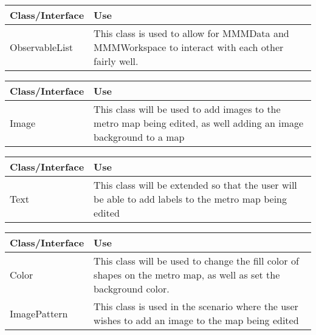 \documentclass[10pt,a4paper]{article}
\begin{document}
\begin{center}
\begin{tabular}{| l | p{12cm} |}
\hline
Class/Interface & Use \\ \hline
ObservableList & This class is used to allow for MMMData and MMMWorkspace to interact with each other fairly well. \\ \hline
\end{tabular}
\end{center}

\begin{center}
\begin{tabular}{| l | p{12cm} |}
\hline
Class/Interface & Use \\ \hline
Image & This class will be used to add images to the metro map being edited, as well adding an image background to a map\\ \hline
\end{tabular}
\end{center}

\begin{center}
\begin{tabular}{| l | p{12cm} |}
\hline
Class/Interface & Use \\ \hline
Text & This class will be extended so that the user will be able to add labels to the metro map being edited \\ \hline
\end{tabular}
\end{center}

\begin{center}
\begin{tabular}{| l | p{12cm} |}
\hline
Class/Interface & Use \\ \hline
Color & This class will be used to change the fill color of shapes on the metro map, as well as set the background color. \\ \hline
ImagePattern & This class is used in the scenario where the user wishes to add an image to the map being edited \\ \hline
\end{tabular}
\end{center}
\end{document}
